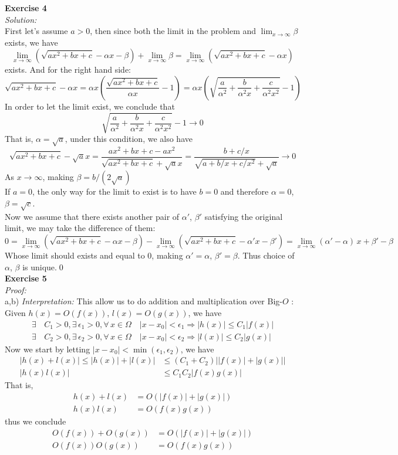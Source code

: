 \documentclass[12pt]{article}
\begin{document}
\textbf{Exercise 4}\\ 
\textit{Solution:}\\
First let's assume $a>0$, then since both the limit in the problem and $\displaystyle\lim_{x\to\infty}\beta$ exists, we have 
\[
\lim_{x\to\infty}\left(\sqrt{ax^2+bx+c}-\alpha x-\beta \right)+\lim_{x\to\infty}\beta=\lim_{x\to\infty}\left(\sqrt{ax^2+bx+c}-\alpha x \right)
\] exists.
And for the right hand side:
\[
\sqrt{ax^2+bx+c}-\alpha x=\alpha x\left(\frac{\sqrt{ax^2+bx+c}}{\alpha x}-1 \right)=
\alpha x\left(\sqrt{\frac{a}{{\alpha}^2}+\frac{b}{{\alpha}^2x}+\frac{c}{{\alpha}^2x^2}}-1 \right)
\]
In order to let the limit exist, we conclude that 
\[
\sqrt{\frac{a}{{\alpha}^2}+\frac{b}{{\alpha}^2x}+\frac{c}{{\alpha}^2x^2}}-1\to 0
\]
That is, $\alpha=\sqrt a$, under this condition, we also have
\[
\sqrt{ax^2+bx+c}-\sqrt a x=\frac{ax^2+bx+c- ax^2}{\sqrt{ax^2+bx+c}+\sqrt a x}=\frac{b+c/x}{\sqrt{a+b/x+c/{x^2}}+\sqrt a}\to 0
\]
As $x\to\infty$, making $\beta=b/(2\sqrt{a})$\\
If $a=0$, the only way for the limit to exist is to have $b=0$ and therefore $\alpha=0$, $\beta=\sqrt{c}$.\\
Now we assume that there exists another pair of $\alpha'$, $\beta'$ satisfying the original limit, we may take the difference of them:
\[
0=\lim_{x\to\infty}\left(\sqrt{ax^2+bx+c}-\alpha x-\beta \right)-\lim_{x\to\infty}\left(\sqrt{ax^2+bx+c}-\alpha' x-\beta' \right)=\lim_{x\to\infty}(\alpha'-\alpha)\,x+\beta'-\beta
\]
Whose limit should exists and equal to 0, making $\alpha'=\alpha$, $\beta'=\beta$. Thus choice of  $\alpha$, $\beta$ is unique.\qed\\

\textbf{Exercise 5}\\ 
\textit{Proof:}\\
a,b) 
{\sl Interpretation:} This allow us to do addition and multiplication over Big-$O$ :\\
Given $h(x)=O(f(x))$, $l(x)=O(g(x))$, we have
\begin{align*}
\exists\, &C_1>0 , \exists\, \epsilon_1>0, \forall\, x\in\Omega\quad |x-x_0|<\epsilon_1 \Rightarrow |h(x)|\leq C_1|f(x)|\\
\exists\, &C_2>0 , \exists\, \epsilon_2>0, \forall\, x\in\Omega\quad |x-x_0|<\epsilon_2 \Rightarrow |l(x)|\leq C_2|g(x)|
\end{align*}
Now we start by letting $|x-x_0|<\min(\epsilon_1,\epsilon_2)$, we have
\begin{align*}
|h(x)+l(x)|\leq|h(x)|+|l(x)|&\leq(C_1+C_2)\left||f(x)|+|g(x)|\right|\\
|h(x)l(x)|&\leq C_1C_2|f(x)g(x)|
\end{align*}
That is, 
\begin{align*}
h(x)+l(x)&=O(|f(x)|+|g(x)|)\\
h(x)l(x)&= O(f(x)g(x))
\end{align*}
thus we conclude 
\begin{align*}
O(f(x))+O(g(x))&=O(|f(x)|+|g(x)|)\\
O(f(x))O(g(x))&= O(f(x)g(x))
\end{align*}
\end{document}
